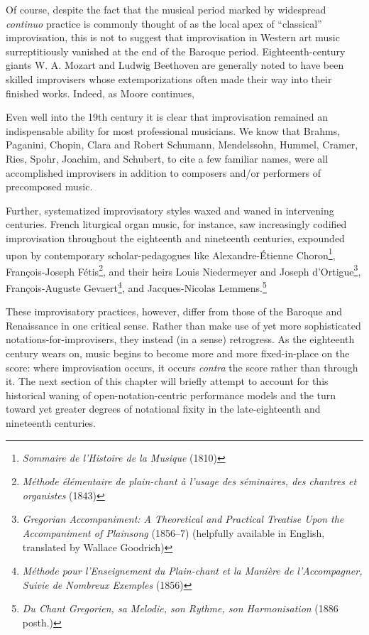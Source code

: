     Of course, despite the fact that the musical period marked by widespread \textit{continuo} practice is commonly thought of as the local apex of ``classical'' improvisation, this is not to suggest that improvisation in Western art music surreptitiously vanished at the end of the Baroque period. Eighteenth-century giants W. A. Mozart and Ludwig Beethoven are generally noted to have been skilled improvisers whose extemporizations often made their way into their finished works. Indeed, as Moore continues,

        \begin{smallquote}
            Even well into the 19th century it is clear that improvisation remained an indispensable ability for most professional musicians. We know that Brahms, Paganini, Chopin, Clara and Robert Schumann, Mendelssohn, Hummel, Cramer, Ries, Spohr, Joachim, and Schubert, to cite a few familiar names, were all accomplished improvisers in addition to composers and/or performers of precomposed music.
        \end{smallquote}
    
    \noindent Further, systematized improvisatory styles waxed and waned in intervening centuries. French liturgical organ music, for instance, saw increasingly codified improvisation throughout the eighteenth and nineteenth centuries, expounded upon by contemporary scholar-pedagogues like Alexandre-Étienne Choron\footnote{\textit{Sommaire de l'Histoire de la Musique} (1810)}, François-Joseph Fétis\footnote{\textit{Méthode élémentaire de plain-chant à l'usage des séminaires, des chantres et organistes} (1843)}, and their heirs Louis Niedermeyer and Joseph d'Ortigue\footnote{\textit{Gregorian Accompaniment: A Theoretical and Practical Treatise Upon the Accompaniment of Plainsong} (1856--7) (helpfully available in English, translated by Wallace Goodrich)}, François-Auguste Gevaert\footnote{\textit{Méthode pour l'Enseignement du Plain-chant et la Manière de l'Accompagner, Suivie de Nombreux Exemples} (1856)}, and Jacques-Nicolas Lemmens.\footnote{\textit{Du Chant Gregorien, sa Melodie, son Rythme, son Harmonisation} (1886 posth.)}

    These improvisatory practices, however, differ from those of the Baroque and Renaissance in one critical sense. Rather than make use of yet more sophisticated notations-for-improvisers, they instead (in a sense) retrogress. As the eighteenth century wears on, music begins to become more and more fixed-in-place on the score: where improvisation occurs, it occurs \textit{contra} the score rather than through it. The next section of this chapter will briefly attempt to account for this historical waning of open-notation-centric performance models and the turn toward yet greater degrees of notational fixity in the late-eighteenth and nineteenth centuries.

